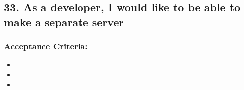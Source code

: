 \subsection*{33. As a developer, I would like to be able to make a separate server}


\subsubsection*{Acceptance Criteria:}

\begin{itemize}
\item 
\item 
\item 
\end{itemize}
